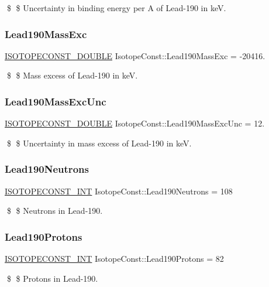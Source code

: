 \$ \$ Uncertainty in binding energy per A of Lead-\/190 in keV. \mbox{\label{group___isotope_const-_lead-_pb190_ga24e7a32ac11f41f431c8ce73161474d4}} 
\subsubsection{\texorpdfstring{Lead190\+Mass\+Exc}{Lead190MassExc}}
{\footnotesize\ttfamily \mbox{\hyperlink{group___isotope_const-_macros_ga8f45a7272ce02c0b4c65c44636ed719a}{I\+S\+O\+T\+O\+P\+E\+C\+O\+N\+S\+T\+\_\+\+D\+O\+U\+B\+LE}} Isotope\+Const\+::\+Lead190\+Mass\+Exc = -\/20416.}

\$ \$ Mass excess of Lead-\/190 in keV. \mbox{\label{group___isotope_const-_lead-_pb190_ga5d82d99e2829bb4bc15bcf83b9c652f7}} 
\subsubsection{\texorpdfstring{Lead190\+Mass\+Exc\+Unc}{Lead190MassExcUnc}}
{\footnotesize\ttfamily \mbox{\hyperlink{group___isotope_const-_macros_ga8f45a7272ce02c0b4c65c44636ed719a}{I\+S\+O\+T\+O\+P\+E\+C\+O\+N\+S\+T\+\_\+\+D\+O\+U\+B\+LE}} Isotope\+Const\+::\+Lead190\+Mass\+Exc\+Unc = 12.}

\$ \$ Uncertainty in mass excess of Lead-\/190 in keV. \mbox{\label{group___isotope_const-_lead-_pb190_ga215894c091d7fdf0defae8858bbc9d62}} 
\subsubsection{\texorpdfstring{Lead190\+Neutrons}{Lead190Neutrons}}
{\footnotesize\ttfamily \mbox{\hyperlink{group___isotope_const-_macros_ga5f18360b3e99483a35c32d789e62621c}{I\+S\+O\+T\+O\+P\+E\+C\+O\+N\+S\+T\+\_\+\+I\+NT}} Isotope\+Const\+::\+Lead190\+Neutrons = 108}

\$ \$ Neutrons in Lead-\/190. \mbox{\label{group___isotope_const-_lead-_pb190_ga9602d713931a3a03e481d0d03dbfb9f4}} 
\subsubsection{\texorpdfstring{Lead190\+Protons}{Lead190Protons}}
{\footnotesize\ttfamily \mbox{\hyperlink{group___isotope_const-_macros_ga5f18360b3e99483a35c32d789e62621c}{I\+S\+O\+T\+O\+P\+E\+C\+O\+N\+S\+T\+\_\+\+I\+NT}} Isotope\+Const\+::\+Lead190\+Protons = 82}

\$ \$ Protons in Lead-\/190. 